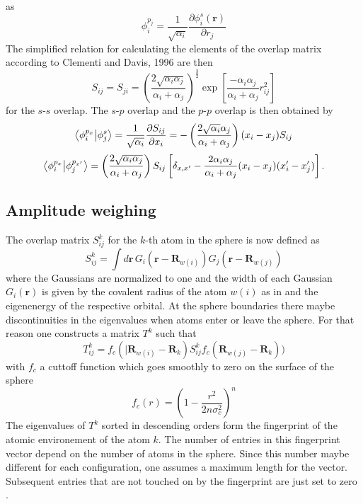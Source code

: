 as
\begin{equation}\phi_i^{p_j}=\frac{1}{\sqrt{\alpha_i}}\frac{\partial\phi_i^s(\mathbf{r})}{\partial r_j}\end{equation}
The simplified relation for calculating the elements of the overlap matrix according to Clementi and Davis, 1996 \cite{Clementi1966} are then
\begin{equation}S_{ij}=S_{ji}=\left(\frac{2\sqrt{\alpha_i\alpha_j}}{\alpha_i+\alpha_j}\right)^\frac{3}{2}\exp\left[\frac{-\alpha_i\alpha_j}{\alpha_i+\alpha_j}r_{ij}^2\right]\end{equation}
for the $s$-$s$ overlap. The $s$-$p$ overlap and the $p$-$p$ overlap is then obtained by
\begin{equation}\bra{\phi_i^{p_x}}\ket{\phi_j^s}=\\ \frac{1}{\sqrt{\alpha_i}}\frac{\partial S_{ij}}{\partial x_i}=-\left(\frac{2\sqrt{\alpha_i}\alpha_j}{\alpha_i+\alpha_j}\right)(x_i-x_j)S_{ij}\end{equation}
\begin{equation}\bra{\phi_i^{p_x}}\ket{\phi_j^{p_{x'}}}=\left(\frac{2\sqrt{\alpha_i\alpha_j}}{\alpha_i+\alpha_j}\right)S_{ij}\left[\delta_{x,x'}-\frac{2\alpha_i\alpha_j}{\alpha_i+\alpha_j}(x_i-x_j)(x'_i-x'_j)\right].\end{equation}

\subsection{Amplitude weighing}
The overlap matrix $S^k_{ij}$ for the $k$-th atom in the sphere is now defined as
\begin{equation}S^k_{ij}=\int d\mathbf{r}\, G_i(\mathbf{r}-\mathbf{R}_{w(i)})G_j(\mathbf{r}-\mathbf{R}_{w(j)})\end{equation}
where the Gaussians are normalized to one and the width of each Gaussian $G_i(\mathbf{r})$ is given by the covalent radius of the atom $w(i)$ as in \cite{Zhu2016} and the eigenenergy of the respective orbital. At the sphere boundaries there maybe discontinuities in the eigenvalues when atoms enter or leave the sphere. For that reason one constructs a matrix $T^k$ such that
\begin{equation}T^k_{ij}=f_c(|\mathbf{R}_{w(i)}-\mathbf{R}_k)S^k_{ij}f_c(\mathbf{R}_{w(j)}-\mathbf{R}_k))\end{equation}
with $f_c$ a cuttoff function which goes smoothly to zero on the surface of the sphere
\begin{equation}f_c(r)=\left(1-\frac{r^2}{2n\sigma_c^2}\right)^n\end{equation}
The eigenvalues of $T^k$ sorted in descending orders form the fingerprint of the atomic environement of the atom $k$. The number of entries in this fingerprint vector depend on the number of atoms in the sphere. Since this number maybe different for each configuration, one assumes a maximum length for the vector. Subsequent entries that are not touched on by the fingerprint are just set to zero \cite{Zhu2016}.
